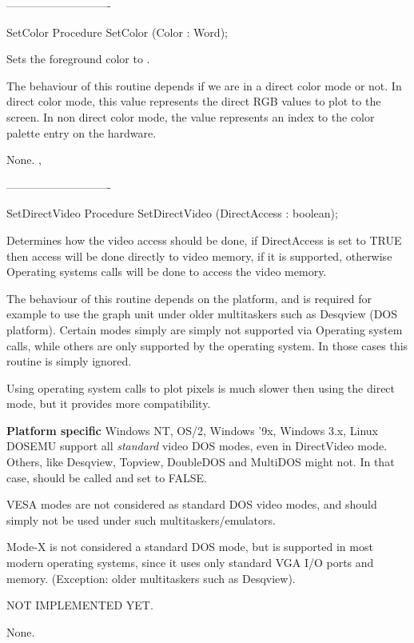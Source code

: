 ----------------------------
\begin{procedure}{SetColor}
\Declaration
Procedure SetColor (Color : Word);

\Description
Sets the foreground color to
.

The behaviour of this routine depends if we are in a direct color
mode or not. In direct color mode, this value represents the direct
RGB values to plot to the screen. In non direct color mode, the value
represents an index to the color palette entry on the hardware.

\Errors
None.
\SeeAlso
{}, 
\end{procedure}
----------------------------
\begin{procedure}{SetDirectVideo}
\Declaration
Procedure SetDirectVideo (DirectAccess : boolean);

\Description
Determines how the video access should be done, if DirectAccess
is set to TRUE then access will be done directly to video memory, if
it is supported, otherwise Operating systems calls will be done to
access the video memory.

The behaviour of this routine depends on the platform, and is required
for example to use the graph unit under older multitaskers such as
Desqview (DOS platform). Certain modes simply are simply not supported
via Operating system calls, while others are only supported by the
operating system. In those cases this routine is simply ignored.

Using operating system calls to plot pixels is much slower then using
the direct mode, but it provides more compatibility.

\textbf{Platform specific}
Windows NT, OS/2, Windows '9x, Windows 3.x, Linux DOSEMU support
all \textit{standard} video DOS modes, even in DirectVideo mode.
Others, like Desqview, Topview, DoubleDOS and MultiDOS might not.
In that case,  should be called and set to FALSE.

VESA modes are not considered as standard DOS video modes,
and should simply not be used under such multitaskers/emulators.

Mode-X is not considered a standard DOS mode, but is supported in
most modern operating systems, since it uses only standard VGA
I/O ports and memory. (Exception: older multitaskers such as Desqview).

NOT IMPLEMENTED YET.


\Errors
None.
\SeeAlso
{}
\end{procedure}

